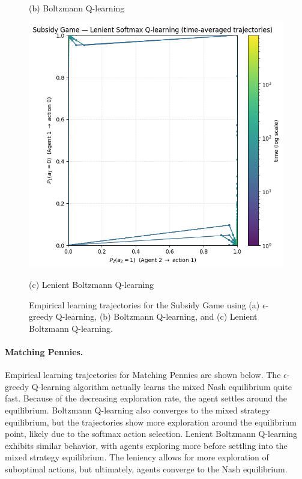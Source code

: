 \begin{figure}[h]
\begin{minipage}{0.32\textwidth}
        \caption*{(b) Boltzmann Q-learning}
    \end{minipage}
    \hfill
    \begin{minipage}{0.32\textwidth}
        \centering
        \includegraphics[width=\linewidth]{figures/task-2/learning/sg_lenient.png}
        \caption*{(c) Lenient Boltzmann Q-learning}
    \end{minipage}
    \caption{Empirical learning trajectories for the Subsidy Game using (a) $\epsilon$-greedy Q-learning, (b) Boltzmann Q-learning, and (c) Lenient Boltzmann Q-learning.}
\end{figure}


\paragraph{Matching Pennies.}
Empirical learning trajectories for Matching Pennies are shown below. The $\epsilon$-greedy Q-learning algorithm actually learns the mixed Nash equilibrium quite fast. Because of the decreasing exploration rate, the agent settles around the equilibrium. Boltzmann Q-learning also converges to the mixed strategy equilibrium, but the trajectories show more exploration around the equilibrium point, likely due to the softmax action selection. Lenient Boltzmann Q-learning exhibits similar behavior, with agents exploring more before settling into the mixed strategy equilibrium. The leniency allows for more exploration of suboptimal actions, but ultimately, agents converge to the Nash equilibrium.

